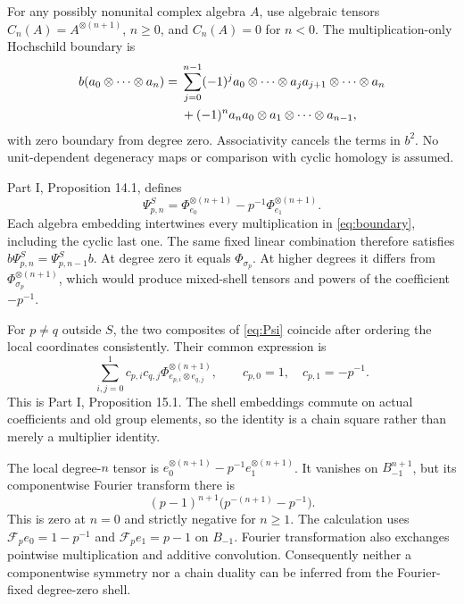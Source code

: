 \documentclass[11pt,letterpaper]{article}
\theoremstyle{definition}
\theoremstyle{remark}
\begin{document}
For any possibly nonunital complex algebra $A$, use algebraic tensors
$C_n(A)=A^{\otimes(n+1)}$, $n\ge0$, and $C_n(A)=0$ for $n<0$.
The multiplication-only Hochschild boundary is
\begin{align}
 b(a_0\otimes\cdots\otimes a_n)
 ={}&\sum_{j=0}^{n-1}(-1)^j
 a_0\otimes\cdots\otimes a_ja_{j+1}\otimes\cdots\otimes a_n\notag\\
 &+(-1)^n a_na_0\otimes a_1\otimes\cdots\otimes a_{n-1},
 \label{eq:boundary}
\end{align}
with zero boundary from degree zero. Associativity cancels the terms
in $b^2$. No unit-dependent degeneracy maps or comparison with cyclic
homology is assumed.

Part I, Proposition 14.1, defines
\begin{equation}
 \Psi_{p,n}^S=\Phi_{e_0}^{\otimes(n+1)}
                  -p^{-1}\Phi_{e_1}^{\otimes(n+1)}.
 \label{eq:Psi}
\end{equation}
Each algebra embedding intertwines every multiplication in
\eqref{eq:boundary}, including the cyclic last one. The same fixed
linear combination therefore satisfies $b\Psi_{p,n}^S=\Psi_{p,n-1}^Sb$.
At degree zero it equals $\Phi_{\sigma_p}$. At higher degrees it
differs from $\Phi_{\sigma_p}^{\otimes(n+1)}$, which would produce
mixed-shell tensors and powers of the coefficient $-p^{-1}$.

For $p\ne q$ outside $S$, the two composites of \eqref{eq:Psi}
coincide after ordering the local coordinates consistently. Their
common expression is
\begin{equation}
 \sum_{i,j=0}^1 c_{p,i}c_{q,j}
          \Phi_{e_{p,i}\otimes e_{q,j}}^{\otimes(n+1)},\qquad
 c_{p,0}=1,\quad c_{p,1}=-p^{-1}.
 \label{eq:chain-square}
\end{equation}
This is Part I, Proposition 15.1. The shell embeddings commute on
actual coefficients and old group elements, so the identity is a
chain square rather than merely a multiplier identity.

The local degree-$n$ tensor is
$e_0^{\otimes(n+1)}-p^{-1}e_1^{\otimes(n+1)}$. It vanishes on
$B_{-1}^{n+1}$, but its componentwise Fourier transform there is
\begin{equation}
 (p-1)^{n+1}\bigl(p^{-(n+1)}-p^{-1}\bigr).
 \label{eq:Fourier-defect}
\end{equation}
This is zero at $n=0$ and strictly negative for $n\ge1$.
The calculation uses $\mathscr F_pe_0=1-p^{-1}$ and
$\mathscr F_pe_1=p-1$ on $B_{-1}$. Fourier transformation also
exchanges pointwise multiplication and additive convolution.
Consequently neither a componentwise symmetry nor a chain duality
can be inferred from the Fourier-fixed degree-zero shell.
\end{document}
